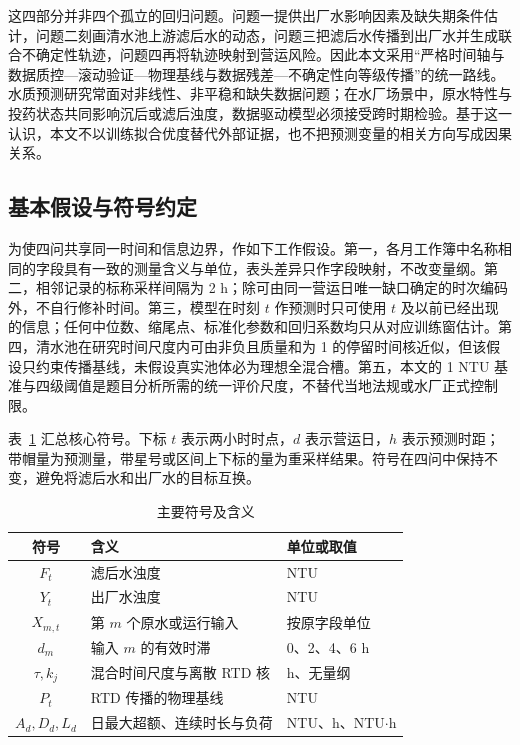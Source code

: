 \documentclass[UTF8,12pt,a4paper]{ctexart}
\begin{document}
这四部分并非四个孤立的回归问题。问题一提供出厂水影响因素及缺失期条件估计，问题二刻画清水池上游滤后水的动态，问题三把滤后水传播到出厂水并生成联合不确定性轨迹，问题四再将轨迹映射到营运风险。因此本文采用“严格时间轴与数据质控---滚动验证---物理基线与数据残差---不确定性向等级传播”的统一路线。水质预测研究常面对非线性、非平稳和缺失数据问题\cite{chen2020}；在水厂场景中，原水特性与投药状态共同影响沉后或滤后浊度，数据驱动模型必须接受跨时期检验\cite{kim2017}。基于这一认识，本文不以训练拟合优度替代外部证据，也不把预测变量的相关方向写成因果关系。

\subsection{基本假设与符号约定}

为使四问共享同一时间和信息边界，作如下工作假设。第一，各月工作簿中名称相同的字段具有一致的测量含义与单位，表头差异只作字段映射，不改变量纲。第二，相邻记录的标称采样间隔为 2 h；除可由同一营运日唯一缺口确定的时次编码外，不自行修补时间。第三，模型在时刻 $t$ 作预测时只可使用 $t$ 及以前已经出现的信息；任何中位数、缩尾点、标准化参数和回归系数均只从对应训练窗估计。第四，清水池在研究时间尺度内可由非负且质量和为 1 的停留时间核近似，但该假设只约束传播基线，未假设真实池体必为理想全混合槽。第五，本文的 1 NTU 基准与四级阈值是题目分析所需的统一评价尺度，不替代当地法规或水厂正式控制限。

表~\ref{tab:symbols} 汇总核心符号。下标 $t$ 表示两小时时点，$d$ 表示营运日，$h$ 表示预测时距；带帽量为预测量，带星号或区间上下标的量为重采样结果。符号在四问中保持不变，避免将滤后水和出厂水的目标互换。

\begin{table}[htbp]
\centering
\caption{主要符号及含义}
\label{tab:symbols}
\begin{tabular}{cll}
\toprule
符号 & 含义 & 单位或取值\\
\midrule
$F_t$ & 滤后水浊度 & NTU\\
$Y_t$ & 出厂水浊度 & NTU\\
$X_{m,t}$ & 第 $m$ 个原水或运行输入 & 按原字段单位\\
$d_m$ & 输入 $m$ 的有效时滞 & 0、2、4、6 h\\
$\tau,k_j$ & 混合时间尺度与离散 RTD 核 & h、无量纲\\
$P_t$ & RTD 传播的物理基线 & NTU\\
$A_d,D_d,L_d$ & 日最大超额、连续时长与负荷 & NTU、h、NTU$\cdot$h\\
\bottomrule
\end{tabular}
\end{table}
\end{document}

